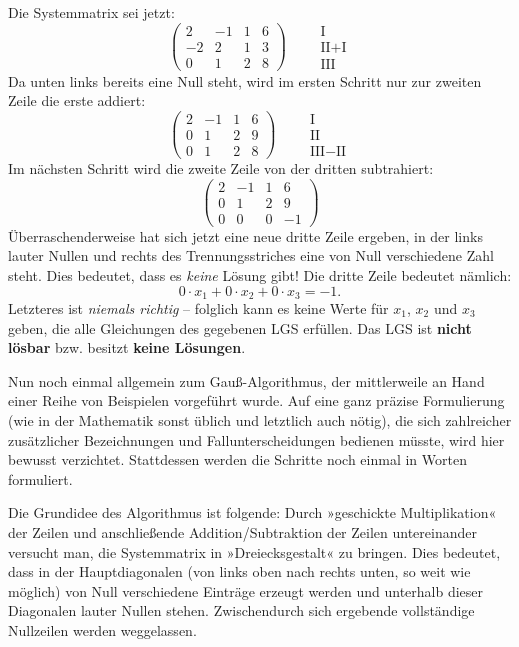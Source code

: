 Die Systemmatrix sei jetzt:
\[ \left(\begin{array}{ccc|c} 2 & -1 & 1 & 6\\ -2 & 2 & 1 & 3\\ 0 & 1 & 2 & 8 \end{array}\right) \qquad \begin{array}{l} \text{I}\\ \text{II}+\text{I}\\ \text{III} \end{array} \]
Da unten links bereits eine Null steht, wird im ersten Schritt nur zur zweiten Zeile die erste addiert:
\[ \left(\begin{array}{ccc|c} 2 & -1 & 1 & 6\\ 0 & 1 & 2 & 9\\ 0 & 1 & 2 & 8 \end{array}\right) \qquad \begin{array}{l} \text{I}\\ \text{II}\\ \text{III}-\text{II} \end{array} \]
Im nächsten Schritt wird die zweite Zeile von der dritten subtrahiert:
\[ \left(\begin{array}{ccc|c} 2 & -1 & 1 & 6\\ 0 & 1 & 2 & 9\\ 0 & 0 & 0 & -1 \end{array}\right) \]
Überraschenderweise hat sich jetzt eine neue dritte Zeile ergeben, in der links lauter Nullen und rechts des Trennungsstriches eine von Null verschiedene Zahl steht.
Dies bedeutet, dass es \emph{keine} Lösung gibt! Die dritte Zeile bedeutet nämlich:
\[ 0 \cdot x_1 + 0 \cdot x_2 + 0 \cdot x_3 = -1 . \]
Letzteres ist \emph{niemals richtig} -- folglich kann es keine Werte für $x_1$, $x_2$ und $x_3$ geben, die alle Gleichungen des gegebenen LGS erfüllen. Das LGS ist \textbf{nicht lösbar} bzw. besitzt \textbf{keine Lösungen}.\beispielende

Nun noch einmal allgemein zum Gauß-Algorithmus, der mittlerweile an Hand einer Reihe von Beispielen vorgeführt wurde. Auf eine ganz präzise Formulierung (wie in der Mathematik sonst üblich und letztlich auch nötig), die sich zahlreicher zusätzlicher Bezeichnungen und Fallunterscheidungen bedienen müsste, wird hier bewusst verzichtet. Stattdessen werden die Schritte noch einmal in Worten formuliert.

Die Grundidee des Algorithmus ist folgende: Durch »geschickte Multiplikation« der Zeilen und anschließende Addition/Subtraktion der Zeilen untereinander versucht man, die Systemmatrix in »Dreiecksgestalt« zu bringen. Dies bedeutet, dass in der Hauptdiagonalen (von links oben nach rechts unten, so weit wie möglich) von Null verschiedene Einträge erzeugt werden und unterhalb dieser Diagonalen lauter Nullen stehen. Zwischendurch sich ergebende vollständige Nullzeilen werden weggelassen.

